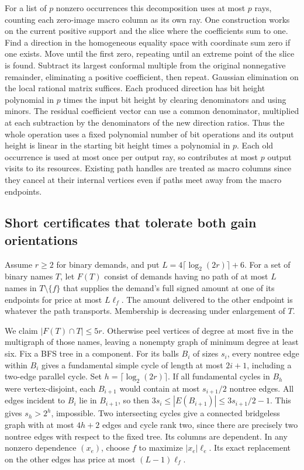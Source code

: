 \documentclass[11pt]{article}
\begin{document}
For a list of \(p\) nonzero occurrences this decomposition uses at most \(p\) rays, counting each zero-image macro column as its own ray. One construction works on the current positive support and the slice where the coefficients sum to one. Find a direction in the homogeneous equality space with coordinate sum zero if one exists. Move until the first zero, repeating until an extreme point of the slice is found. Subtract its largest conformal multiple from the original nonnegative remainder, eliminating a positive coefficient, then repeat. Gaussian elimination on the local rational matrix suffices. Each produced direction has bit height polynomial in \(p\) times the input bit height by clearing denominators and using minors. The residual coefficient vector can use a common denominator, multiplied at each subtraction by the denominators of the new direction ratios. Thus the whole operation uses a fixed polynomial number of bit operations and its output height is linear in the starting bit height times a polynomial in \(p\). Each old occurrence is used at most once per output ray, so contributes at most \(p\) output visits to its resources. Existing path handles are treated as macro columns since they cancel at their internal vertices even if paths meet away from the macro endpoints.

\hypertarget{short-certificates-that-tolerate-both-gain-orientations}{%
\subsection{Short certificates that tolerate both gain orientations}\label{short-certificates-that-tolerate-both-gain-orientations}}

Assume \(r\ge2\) for binary demands, and put \(L=4\lceil\log_2(2r)\rceil+6\). For a set of binary names \(T\), let \(F(T)\) consist of demands having no path of at most \(L\) names in \(T\setminus\{f\}\) that supplies the demand's full signed amount at one of its endpoints for price at most \(L\ell_f\). The amount delivered to the other endpoint is whatever the path transports. Membership is decreasing under enlargement of \(T\).

We claim \(|F(T)\cap T|\le5r\). Otherwise peel vertices of degree at most five in the multigraph of those names, leaving a nonempty graph of minimum degree at least six. Fix a BFS tree in a component. For its balls \(B_i\) of sizes \(s_i\), every nontree edge within \(B_i\) gives a fundamental simple cycle of length at most \(2i+1\), including a two-edge parallel cycle. Set \(h=\lceil\log_2(2r)\rceil\). If all fundamental cycles in \(B_h\) were vertex-disjoint, each \(B_{i+1}\) would contain at most \(s_{i+1}/2\) nontree edges. All edges incident to \(B_i\) lie in \(B_{i+1}\), so then \(3s_i\le |E(B_{i+1})|\le 3s_{i+1}/2-1\). This gives \(s_h>2^h\), impossible. Two intersecting cycles give a connected bridgeless graph with at most \(4h+2\) edges and cycle rank two, since there are precisely two nontree edges with respect to the fixed tree. Its columns are dependent. In any nonzero dependence \((x_e)\), choose \(f\) to maximize \(|x_e|\ell_e\). Its exact replacement on the other edges has price at most \((L-1)\ell_f\).
\end{document}
